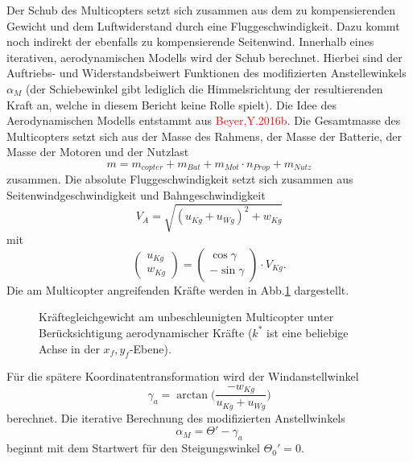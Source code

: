 Der Schub des Multicopters setzt sich zusammen aus dem zu kompensierenden Gewicht und dem Luftwiderstand durch eine Fluggeschwindigkeit. Dazu kommt noch indirekt der ebenfalls zu kompensierende Seitenwind. Innerhalb eines iterativen, aerodynamischen Modells wird der Schub berechnet. Hierbei sind der Auftriebs- und Widerstandsbeiwert Funktionen des modifizierten Anstellewinkels \ensuremath{\alpha_M} (der Schiebewinkel gibt lediglich die Himmelsrichtung der resultierenden Kraft an, welche in diesem Bericht keine Rolle spielt). Die Idee des Aerodynamischen Modells entstammt aus \textcolor{red}{Beyer,Y.2016b}. 
Die Gesamtmasse des Multicopters setzt sich aus der Masse des Rahmens, der Masse der Batterie, der Masse der Motoren und der Nutzlast
\begin{equation}
	m = m_{copter}+m_{Bat}+m_{Mot}\cdot n_{Prop}+m_{Nutz}
	\label{eq:masse_multicopter}
\end{equation}
zusammen.
Die absolute Fluggeschwindigkeit setzt sich zusammen aus Seitenwindgeschwindigkeit und Bahngeschwindigkeit
\begin{equation}
	V_A = \sqrt{(u_{Kg} + u_{Wg})^2+w_{Kg}}
\end{equation}
mit
\begin{equation}
	\begin{pmatrix} u_{Kg} \\ w_{Kg} \end{pmatrix} = \begin{pmatrix}
	\cos\gamma \\ -\sin\gamma	\end{pmatrix} \cdot V_{Kg}.
\end{equation}
Die am Multicopter angreifenden Kräfte werden in Abb.\ref{abb:kraefteggw} dargestellt. 

\begin{figure}[H]
\centering
\begin{small}
	
	\end{small}
	\caption{Kräftegleichgewicht am unbeschleunigten Multicopter unter Berücksichtigung aerodynamischer Kräfte ($k^*$ ist eine beliebige Achse in der $x_f,y_f$-Ebene).}
	\label{abb:kraefteggw}
\end{figure}

Für die spätere Koordinatentransformation wird der Windanstellwinkel
\begin{equation}
	\gamma_a = \arctan \Big(\frac{-w_{Kg}}{u_{Kg}+u_{Wg}}\Big)
\end{equation}
berechnet.
Die iterative Berechnung des modifizierten Anstellwinkels 
\begin{equation}
	\alpha_M = \Theta '-\gamma_a
\end{equation} 
beginnt mit dem Startwert für den Steigungswinkel \ensuremath{\Theta_0'=0}.

